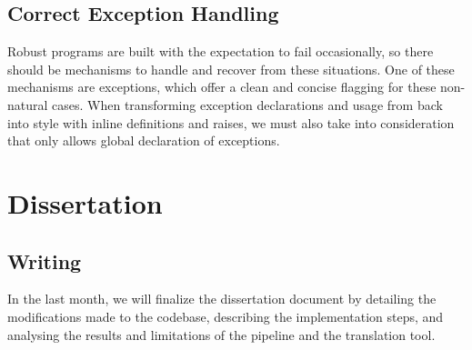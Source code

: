 \subsection{Correct Exception Handling}

Robust programs are built with the expectation to fail occasionally, so there should be mechanisms to handle and recover from these 
situations. One of these mechanisms are exceptions, which offer a clean and concise flagging for these non-natural cases.
When transforming exception declarations and usage from \cml back into \ocaml style with inline definitions and raises, we must also take
into consideration that \cml only allows global declaration of exceptions.

\section{Dissertation}

\subsection{Writing}

In the last month, we will finalize the dissertation document by detailing the modifications made to the codebase, describing the 
implementation steps, and analysing the results and limitations of the pipeline and the translation tool.

